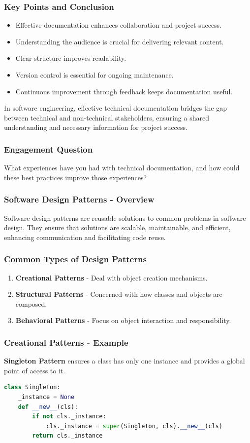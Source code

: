 \documentclass{beamer}
\begin{document}
\begin{frame}[fragile]
    \frametitle{Key Points and Conclusion}
    \begin{itemize}
        \item Effective documentation enhances collaboration and project success.
        \item Understanding the audience is crucial for delivering relevant content.
        \item Clear structure improves readability.
        \item Version control is essential for ongoing maintenance.
        \item Continuous improvement through feedback keeps documentation useful.
    \end{itemize}

    In software engineering, effective technical documentation bridges the gap between technical and non-technical stakeholders, ensuring a shared understanding and necessary information for project success.
\end{frame}

\begin{frame}[fragile]
    \frametitle{Engagement Question}
    What experiences have you had with technical documentation, and how could these best practices improve those experiences?
\end{frame}

\begin{frame}[fragile]
    \frametitle{Software Design Patterns - Overview}
    Software design patterns are reusable solutions to common problems in software design. They ensure that solutions are scalable, maintainable, and efficient, enhancing communication and facilitating code reuse.
\end{frame}

\begin{frame}[fragile]
    \frametitle{Common Types of Design Patterns}
    \begin{enumerate}
        \item \textbf{Creational Patterns} - Deal with object creation mechanisms.
        \item \textbf{Structural Patterns} - Concerned with how classes and objects are composed.
        \item \textbf{Behavioral Patterns} - Focus on object interaction and responsibility.
    \end{enumerate}
\end{frame}

\begin{frame}[fragile]
    \frametitle{Creational Patterns - Example}
    \textbf{Singleton Pattern} ensures a class has only one instance and provides a global point of access to it.
    \begin{lstlisting}[language=Python]
class Singleton:
    _instance = None
    def __new__(cls):
        if not cls._instance:
            cls._instance = super(Singleton, cls).__new__(cls)
        return cls._instance
    \end{lstlisting}
\end{frame}
\end{document}
